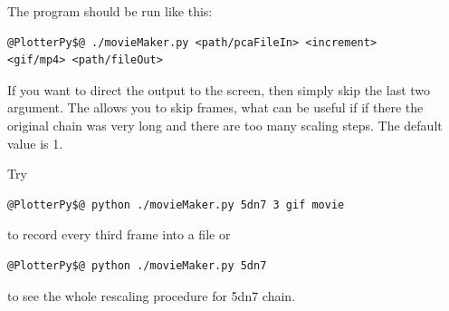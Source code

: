 \documentclass[12pt]{article}
\begin{document}
\begin{mySection}
The program should be run like this:
\begin{lstlisting}
@PlotterPy$@ ./movieMaker.py <path/pcaFileIn> <increment>
<gif/mp4> <path/fileOut>
\end{lstlisting}
If you want to direct the output to the screen, then simply skip the last two argument.
The  allows you to skip frames, what can be useful if if there the original chain was very long and there are too many scaling steps. The default value is 1.

Try 
\begin{lstlisting}
@PlotterPy$@ python ./movieMaker.py 5dn7 3 gif movie
\end{lstlisting}
to record every third frame into a file  or
\begin{lstlisting}
@PlotterPy$@ python ./movieMaker.py 5dn7
\end{lstlisting}
to see the whole rescaling procedure for 5dn7 chain.
\end{mySection}

\end{document}

